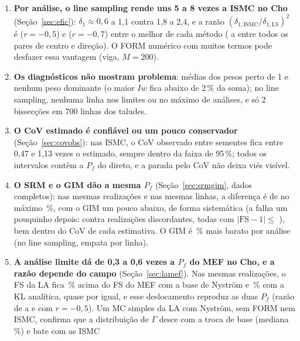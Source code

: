 \documentclass[11pt,a4paper]{article}
\begin{document}
\begin{enumerate}
    entre os métodos, e o FORM modal é barato (0,06 a 0,2 h, mesmo com a parede do gradiente modal). Para CoV de 5\,\%
    no Cho com $r = -0{,}7$: \hDirRb{} h no direto, \hIsmcRb{} na melhor ISMC e \hLsRb{} no line sampling modal; a
    etapa 3b inteira (30 ISMC) gastou \hIsmcTotal{} h$\cdot$núcleo.
  \item \textbf{Por análise, o line sampling rende uns 5 a 8 vezes a ISMC no Cho} (Seção~\ref{sec:efic}):
    $\delta_1 \approx 0{,}6$ a 1,1 contra 1,8 a 2,4, e a razão $(\delta_{1,\text{ISMC}}/\delta_{1,\text{LS}})^2$ é
    \lsIsmcMelhorRa{} ($r = -0{,}5$) e \lsIsmcMelhorRb{} ($r = -0{,}7$) entre o melhor de cada método (\lsIsmcMin{} a
    \lsIsmcMax{} entre todos os pares de centro e direção). O FORM numérico com muitos termos pode desfazer essa vantagem (viga, $M = 200$).
  \item \textbf{Os diagnósticos não mostram problema}: médias dos pesos perto de 1 e nenhum peso dominante (o maior
    $I w$ fica abaixo de 2\,\% da soma); no line sampling, nenhuma linha nos limites ou no máximo de análises, e só 2 bissecções em 700
    linhas dos taludes.
  \item \textbf{O CoV estimado é confiável ou um pouco conservador} (Seção~\ref{sec:covobs}): nas ISMC, o CoV observado
    entre sementes fica entre 0,47 e 1,13 vezes o estimado, sempre dentro da faixa de 95\,\%; todos os intervalos
    contêm a $P_f$ do direto, e a parada pelo CoV não deixa viés visível.
  \item \textbf{O SRM e o GIM dão a mesma $P_f$} (Seção~\ref{sec:srmgim}, dados completos): nas mesmas realizações e
    nas mesmas linhas, a diferença é de no máximo \sgDifAbsMax\,\%, com o GIM um pouco abaixo, de forma sistemática (a
    falha um pouquinho depois: \sgDistSrm{} contra \sgDistGim{} realizações discordantes, todas com
    $|\mathrm{FS} - 1| \le$ \sgDiscFS), bem dentro do CoV de cada estimativa. O GIM é \sgEcon\,\% mais barato por
    análise (no line sampling, empata por linha).
  \item \textbf{A análise limite dá de 0,3 a 0,6 vezes a $P_f$ do MEF no Cho, e a razão depende do campo}
    (Seção~\ref{sec:lamef}). Nas mesmas realizações, o FS da LA fica \lmDesNyRa\,\% acima do FS do MEF com a base de
    Nyström e \lmDesAnRa\,\% com a KL analítica, quase por igual, e esse deslocamento reproduz as duas $P_f$ (razão de
    \lmIsRazRaMin{} a \lmIsRazRaMax{} e \lmDirRaRaz{} com $r = -0{,}5$). Um MC simples da LA com Nyström, sem FORM nem
    ISMC, confirma que a distribuição de $\Gamma$ desce com a troca de base (mediana \lnyMed\,\%) e bate com as ISMC

\end{enumerate}
\end{document}

